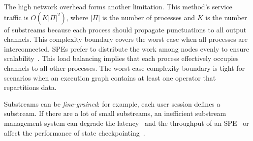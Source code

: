 The high network overhead forms another limitation. This method's service traffic is $O(K|\Pi|^2)$, where $|\Pi|$ is the number of processes and $K$ is the number of substreams because each process should propagate punctuations to all output channels. This complexity boundary covers the worst case when all processes are interconnected. SPEs prefer to distribute the work among nodes evenly to ensure scalability~\cite{carbone2015apache, Kulkarni:2015:THS:2723372.2742788, Akidau:2013:MFS:2536222.2536229}. This load balancing implies that each process effectively occupies channels to all other processes. The worst-case complexity boundary is tight for scenarios when an execution graph contains at least one operator that repartitions data.

Substreams can be {\em fine-grained}: for example, each user session defines a substream. If there are a lot of small substreams, an inefficient substream management system can degrade the latency~\cite{DBLP:journals/pvldb/BegoliACHKKMS21} and the throughput of an SPE~\cite{Li:2008:OPN:1453856.1453890} or affect the performance of state checkpointing~\cite{zhang2021research}.
